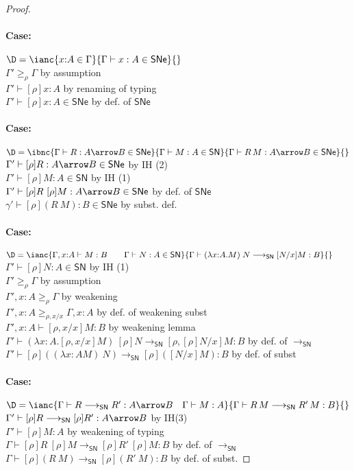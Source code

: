 \documentclass{article}
\newcommand{\ext}[1]{\geq_{#1}}
\newcommand{\SN}{\mathsf{SN}}
\newcommand{\SNe}{\mathsf{SNe}}
\newcommand{\redSN}{\longrightarrow_\SN}
\begin{document}
\begin{proof}
	\paragraph{Case:} $\D = \ianc{x{:}A \in \Gamma}{\Gamma \vdash x : A \in \SNe}{} $
	\\[1em]
	$\Gamma' \ext {\rho} \Gamma$ \hfill by assumption \\
	$\Gamma' \vdash [\rho]x : A$ \hfill by renaming of typing \\
	$\Gamma' \vdash [\rho]x : A \in \SNe$ \hfill by def. of $\SNe$

	\paragraph{Case:} $\D = \ibnc{\Gamma \vdash R : A \arrow B \in \SNe}{\Gamma \vdash M : A \in \SN}{\Gamma \vdash R\,M : A \arrow B \in \SNe}{} $
	\\[1em]
	$\Gamma' \vdash [\rho]R : A \arrow B \in \SNe$ \hfill by IH (2) \\
	$\Gamma' \vdash [\rho]M : A \in \SN$ \hfill by IH (1) \\
	$\Gamma' \vdash [\rho]R~[\rho]M : A \arrow B \in \SNe$ \hfill by def. of $\SNe$\\
	$\gamma' \vdash [\rho](R~M) : B \in \SNe$ \hfill by subst. def.

	\paragraph{Case:}$\D = \ianc{\Gamma, x{:}A \vdash M : B \qquad \Gamma \vdash N : A \in \SN}{\Gamma \vdash (\lambda x{:}A.M)\;N \redSN [N/x]M : B}{} \qquad$
	\\[1em]
	$\Gamma' \vdash [\rho]N : A\in \SN$ \hfill by IH (1) \\
	$\Gamma' \ext{\rho} \Gamma$ \hfill by assumption \\
	$\Gamma', x{:}A \ext{\rho} \Gamma$ \hfill by weakening\\
	$\Gamma', x{:}A \ext{\rho, x/x} \Gamma, x{:}A$ \hfill by def. of weakening subst\\
	$\Gamma', x{:}A \vdash [\rho, x/x]M : B$ \hfill by weakening lemma \\
	$\Gamma' \vdash (\lambda x{:}A.[\rho, x/x]M)~[\rho]N \redSN [\rho, [\rho]N/x]M : B$ \hfill by def. of $\redSN$\\
	$\Gamma' \vdash [\rho]((\lambda x{:}A M)~N) \redSN [\rho]([N/x]M) : B$ \hfill by def. of subst

	\paragraph{Case:}$\D = \ianc{\Gamma \vdash R \redSN R' : A \arrow B \quad \Gamma \vdash M : A}{\Gamma \vdash R\,M \redSN R'\,M : B}{}$\\[1em]
	$\Gamma' \vdash [\rho]R \redSN [\rho]R': A \arrow B$ \hfill by IH(3) \\
	$\Gamma' \vdash [\rho]M : A$ \hfill by weakening of typing \\
	$\Gamma \vdash [\rho]R~[\rho]M \redSN [\rho]R'~[\rho]M : B$ \hfill by def. of $\redSN$\\
	$\Gamma \vdash [\rho](R~M) \redSN [\rho](R'~M) : B$ \hfill by def. of subst.


\end{proof}
\end{document}
